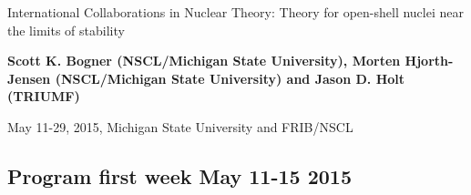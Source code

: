 \documentclass[%
twoside,                 %
final,                   %
10pt]{article}
\begin{document}






\thispagestyle{empty}

\begin{center}
{\LARGE\bf
\begin{spacing}{1.25}
International Collaborations in Nuclear Theory: Theory for open-shell nuclei near the limits of stability
\end{spacing}
}
\end{center}


\begin{center}
{\bf Scott K. Bogner (NSCL/Michigan State University), Morten Hjorth-Jensen (NSCL/Michigan State University) and Jason D. Holt (TRIUMF)${}^{}$} \\ [0mm]
\end{center}

    \begin{center}
\end{center}
    


\begin{center} %
May 11-29, 2015, Michigan State University and FRIB/NSCL
\end{center}

\vspace{1cm}


\subsection{Program first week May 11-15 2015}

\paragraph{}
\end{document}
